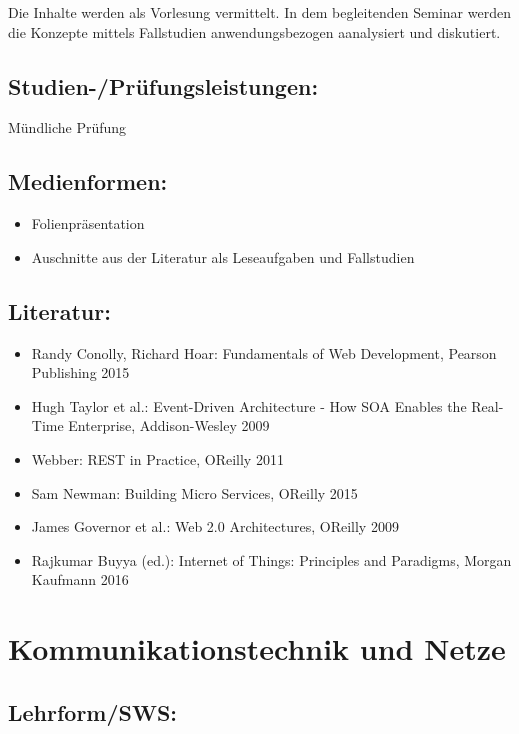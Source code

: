 Die Inhalte werden als Vorlesung vermittelt. In dem begleitenden Seminar
werden die Konzepte mittels Fallstudien anwendungsbezogen aanalysiert
und diskutiert.

\section{Studien-/Prüfungsleistungen:}\label{studien-pruxfcfungsleistungen-11}

Mündliche Prüfung

\section{Medienformen:}\label{medienformen-11}

\begin{itemize}
\tightlist
\item
  Folienpräsentation
\item
  Auschnitte aus der Literatur als Leseaufgaben und Fallstudien
\end{itemize}

\section{Literatur:}\label{literatur-11}

\begin{itemize}
\tightlist
\item
  Randy Conolly, Richard Hoar: Fundamentals of Web Development, Pearson
  Publishing 2015
\item
  Hugh Taylor et al.: Event-Driven Architecture - How SOA Enables the
  Real-Time Enterprise, Addison-Wesley 2009
\item
  Webber: REST in Practice, OReilly 2011
\item
  Sam Newman: Building Micro Services, OReilly 2015
\item
  James Governor et al.: Web 2.0 Architectures, OReilly 2009
\item
  Rajkumar Buyya (ed.): Internet of Things: Principles and Paradigms,
  Morgan Kaufmann 2016
\end{itemize}

\chapter{Kommunikationstechnik und
Netze}\label{kommunikationstechnik-und-netze}

\section{Lehrform/SWS:}\label{lehrformsws-12}

